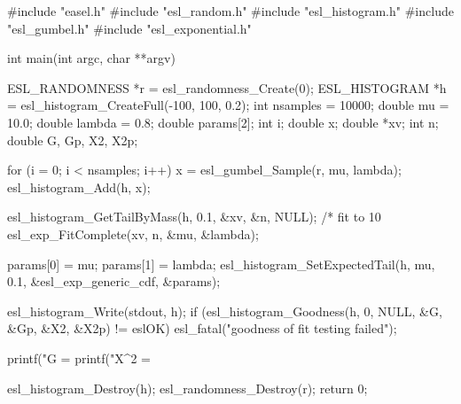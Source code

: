 \begin{cchunk}
#include "easel.h"
#include "esl_random.h"
#include "esl_histogram.h"
#include "esl_gumbel.h"
#include "esl_exponential.h"

int
main(int argc, char **argv)
{
  ESL_RANDOMNESS *r  = esl_randomness_Create(0);
  ESL_HISTOGRAM  *h  = esl_histogram_CreateFull(-100, 100, 0.2);
  int     nsamples    = 10000;
  double  mu          = 10.0;
  double  lambda      = 0.8;
  double  params[2];
  int     i;
  double  x;
  double *xv;
  int     n;
  double  G, Gp, X2, X2p;

  for (i = 0; i < nsamples; i++) {
    x = esl_gumbel_Sample(r, mu, lambda);
    esl_histogram_Add(h, x);
  }

  esl_histogram_GetTailByMass(h, 0.1, &xv, &n, NULL); /* fit to 10%
  esl_exp_FitComplete(xv, n, &mu, &lambda);

  params[0] = mu;
  params[1] = lambda;
  esl_histogram_SetExpectedTail(h, mu, 0.1, &esl_exp_generic_cdf, &params);

  esl_histogram_Write(stdout, h);
  if (esl_histogram_Goodness(h, 0, NULL, &G, &Gp, &X2, &X2p) != eslOK)
    esl_fatal("goodness of fit testing failed");

  printf("G   = %
  printf("X^2 = %

  esl_histogram_Destroy(h);
  esl_randomness_Destroy(r);
  return 0;
}
\end{cchunk}
